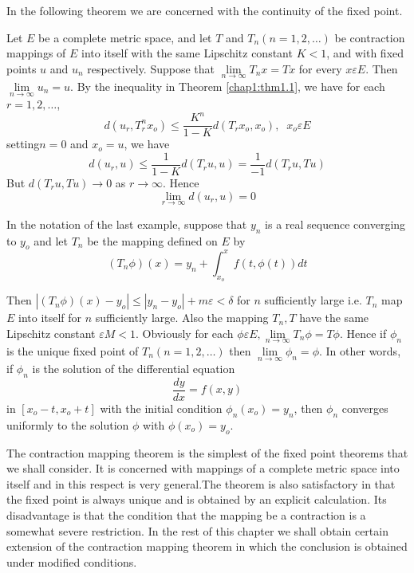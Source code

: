 In the following theorem we are concerned with the continuity of the
fixed point. 

\begin{thmm}%
  Let $E$ be a complete metric space, and let $T$ and $T_n (n=1,
  2,\ldots)$ be contraction mappings of $E$ into itself with the same
  Lipschitz constant $K<1$, and with fixed points $u$ and $u_n$
  respectively. Suppose that $\lim\limits_{n \to \infty} T_nx = Tx$
  for every $x \varepsilon E$. Then $\lim\limits_{n \to \infty} u_n = u$. By
  the inequality in Theorem \ref{chap1:thm1.1}, we have for each $r=1,
  2,\ldots$,  
  $$
  d (u_r , T_r^n x_o) \leq \frac{K^n}{1-K} d (T_r x_o, x_o), \;\; x_o
  \varepsilon E 
  $$
  setting\pageoriginale $n=0$ and $x_o = u$, we have
  $$
  d (u_r, u) \leq \frac{1}{1-K} d(T_r u, u) = \frac{1}{-1} d (T_r u, Tu)
  $$
But $d(T_r u, Tu) \to 0$ as $r \to \infty$. Hence
$$
\lim_{r \to \infty} d(u_r, u) =0
$$
\end{thmm}

\begin{example*}
  In the notation of the last example, suppose that $y_n$ is a real
  sequence converging to $y_o$ and let $T_n$ be the mapping defined on
  $E$ by 
  $$
  (T_n \phi)(x) = y_n + \int_{x_{o}}^{x}f (t, \phi (t)) dt
  $$
\end{example*}

Then $|(T_n \phi) (x) - y_o| \leq |y_n - y_o| + m \varepsilon < \delta$ for
$n$ sufficiently large i.e. $T_n$ map $E$ into itself for $n$
sufficiently large. Also the mapping $T_n, T$ have the same Lipschitz
constant $\varepsilon M < 1$. Obviously for each $\phi \varepsilon E, \lim\limits_{n
  \to \infty} T_n \phi = T \phi $. Hence if $\phi_n$ is the unique
fixed point of $T_n (n =1, 2, \ldots)$ then $\lim\limits_{n \to
  \infty} \phi_n = \phi$. In other words, if $\phi_n$ is the solution
of the differential equation 
$$
\frac{dy}{dx} = f(x,y)
$$
in $[x_o -t, x_o +t]$ with the initial condition $\phi_n (x_o) = y_n$,
then $\phi_n$ converges uniformly to the solution $\phi$ with $\phi
(x_o) = y_o$.  

\begin{remark*}
  The contraction mapping theorem is the simplest of the fixed point
  theorems that we shall consider. It is concerned with mappings of a
  complete metric space into itself and in this respect is very
  general.\pageoriginale The theorem is also satisfactory in that the
  fixed point is 
  always  unique and is obtained by an explicit calculation. Its
  disadvantage is that the condition that the mapping be a contraction
  is a somewhat severe restriction. In the rest of this chapter we
  shall obtain certain extension of the contraction mapping theorem in
  which the conclusion is obtained under modified conditions.  
\end{remark*}

